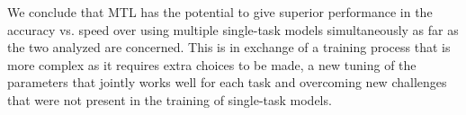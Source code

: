 We conclude that MTL has the potential to give superior performance in the accuracy vs. speed over using multiple single-task models simultaneously as far as the two analyzed are concerned. This is in exchange of a training process that is more complex as it requires extra choices to be made, a new tuning of the parameters that jointly works well for each task and overcoming new challenges that were not present in the training of single-task models.